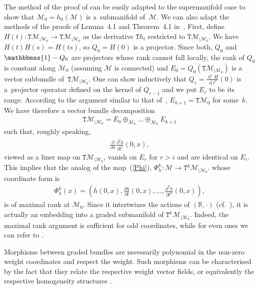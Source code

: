 \documentclass[10pt,a4paper]{amsart}
\newcommand{\Id}{\mathbbmss{1}}
\def\sT{{\mathtt T}}
\def\xd{\operatorname{d}}
\numberwithin{equation}{section}
\begin{document}
\begin{Remark}
The method of the proof of \cite[Theorem~1.13]{KMS} can be easily adapted to the supermanifold case to show that ${\mathcal M}_0=h_0({\mathcal M})$ is a~submanifold of~${\mathcal M}$. We can also adapt the methods of the proofs of Lemma~4.1 and Theorem~4.1 in~\cite{Grabowski2012}.
First, def\/ine $H(t)\colon \sT{\mathcal M}_{|{\mathcal M}_0}\to\sT{\mathcal M}_{|{\mathcal M}_0}$ as the derivative $\sT {h_t}$ restricted to $\sT{\mathcal M}_{|{\mathcal M}_0}$. We have $H(t)H(s)=H(ts)$, so $Q_0=H(0)$ is a projector. Since both, $Q_0$ and $\Id-Q_0$ are projectors whose rank cannot fall locally, the rank of $Q_0$ is constant along ${\mathcal M}_0$ (assuming ${\mathcal M}$ is connected) and $E_0=Q_0(\sT{\mathcal M}_{|{\mathcal M}_0})$ is a vector subbundle of~$\sT{\mathcal M}_{|{\mathcal M}_0}$. One can show inductively that
$Q_r=\frac{\xd^r H}{\xd t^r}(0)$ is a~projector operator def\/ined on the kernel of $Q_{r-1}$ and we put
$E_r$ to be its range. According to the argument similar to that of~\cite[Proposition~4.2]{Grabowski2012}, $E_{k+1}=\sT{\mathcal M}_0$ for some~$k$. We have therefore
a vector bundle decomposition
\begin{gather*}
\sT{\mathcal M}_{|{\mathcal M}_0}=E_0\oplus_{{\mathcal M}_0}\dots\oplus_{{\mathcal M}_0}E_{k+1}
\end{gather*}
such that, roughly speaking,
\begin{gather*}
\frac{\partial}{\partial x}\frac{\partial^i h}{\partial t^i}(0,x) ,
\end{gather*}
viewed as a liner map on $\sT{\mathcal M}_{|{\mathcal M}_0}$, vanish on $E_r$ for $r>i$ and are identical on $E_i$.
This implies that the analog of the map~(\ref{Phi}), $\Phi^k_h\colon {\mathcal M}\to\sT^k{\mathcal M}_{|{\mathcal M}_0}$.
whose coordinate form is
\begin{gather*}
\Phi^k_h(x)=\left(h(0,x),\frac{\partial h}{\partial t}(0,x),\dots,\frac{\partial^k h}{\partial t^k}(0,x)\right) ,
\end{gather*}
is of maximal rank at ${\mathcal M}_0$. Since it intertwines the actions of $({\mathbb R},\cdot)$ (cf.~\cite[Lemma~4.1]{Grabowski2012}), it is actually an embedding into a graded submanifold of $\sT^k{\mathcal M}_{|{\mathcal M}_0}$.
Indeed, the maximal rank argument is suf\/f\/icient for odd coordinates, while for even ones we can refer to \cite{Grabowski2012}.
\end{Remark}


Morphisms between graded bundles are necessarily polynomial in the non-zero weight coordinates and respect the weight. Such morphisms can be characterised by the fact that they relate the respective weight vector f\/ields,  or equivalently the respective homogeneity structures  \cite{Grabowski2012}.
\end{document}
